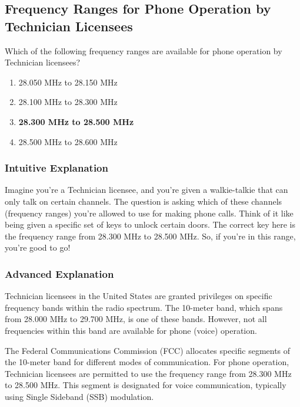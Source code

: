 \subsection{Frequency Ranges for Phone Operation by Technician Licensees}

\begin{tcolorbox}[colback=gray!10!white,colframe=black!75!black,title=T1B01]
Which of the following frequency ranges are available for phone operation by Technician licensees?
\begin{enumerate}[label=\Alph*)]
    \item 28.050 MHz to 28.150 MHz
    \item 28.100 MHz to 28.300 MHz
    \item \textbf{28.300 MHz to 28.500 MHz}
    \item 28.500 MHz to 28.600 MHz
\end{enumerate}
\end{tcolorbox}

\subsubsection{Intuitive Explanation}
Imagine you’re a Technician licensee, and you’re given a walkie-talkie that can only talk on certain channels. The question is asking which of these channels (frequency ranges) you’re allowed to use for making phone calls. Think of it like being given a specific set of keys to unlock certain doors. The correct key here is the frequency range from 28.300 MHz to 28.500 MHz. So, if you’re in this range, you’re good to go!

\subsubsection{Advanced Explanation}
Technician licensees in the United States are granted privileges on specific frequency bands within the radio spectrum. The 10-meter band, which spans from 28.000 MHz to 29.700 MHz, is one of these bands. However, not all frequencies within this band are available for phone (voice) operation. 

The Federal Communications Commission (FCC) allocates specific segments of the 10-meter band for different modes of communication. For phone operation, Technician licensees are permitted to use the frequency range from 28.300 MHz to 28.500 MHz. This segment is designated for voice communication, typically using Single Sideband (SSB) modulation.

